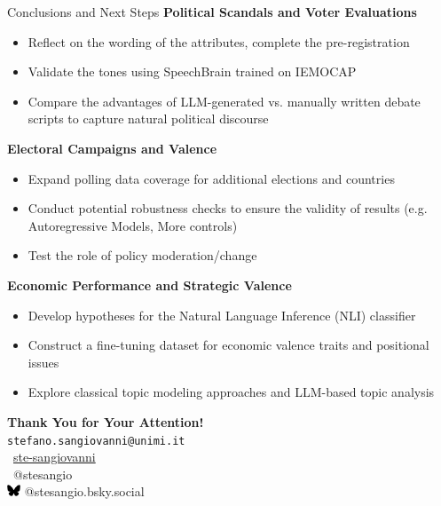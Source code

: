 \documentclass[9pt, aspectratio=169]{beamer}
\newcommand{\customcite}[1]{\textcolor{blue}{\footnotesize\parencite{#1}}}
\begin{document}
\begin{frame}{Conclusions and Next Steps}
    \textbf{Political Scandals and Voter Evaluations}
    \begin{itemize}
        \item Reflect on the wording of the attributes, complete the pre-registration
        \item Validate the tones using SpeechBrain \customcite{speechbrain} trained on IEMOCAP
        \item Compare the advantages of LLM-generated vs. manually written debate scripts to capture natural political discourse
    \end{itemize}
    \vspace{0.2cm}
    \textbf{Electoral Campaigns and Valence}
    \begin{itemize}
        \item Expand polling data coverage for additional elections and countries
        \item Conduct potential robustness checks to ensure the validity of results (e.g. Autoregressive Models, More controls)
        \item Test the role of policy moderation/change 
    \end{itemize}
    \vspace{0.2cm}
    \textbf{Economic Performance and Strategic Valence}
    \begin{itemize}
        \item Develop hypotheses for the Natural Language Inference (NLI) classifier
        \item Construct a fine-tuning dataset for economic valence traits and positional issues
        \item Explore classical topic modeling approaches and LLM-based topic analysis
    \end{itemize}
    \end{frame}

\begin{frame}[plain]
\centering
\vspace{2cm}
\textbf{\large Thank You for Your Attention!} \\ [0.2cm] 
\texttt{stefano.sangiovanni@unimi.it} \\[3cm]

\faGithub\ \href{https://github.com/ste-sangiovanni}{ste-sangiovanni} \\[0.1cm]
\faTwitter\ @stesangio \\ 
\includegraphics[width=0.03\textwidth]{images/Bluesky_logo_(black).svg.png} @stesangio.bsky.social
\vspace{0.2cm}
\end{frame}
\end{document}
